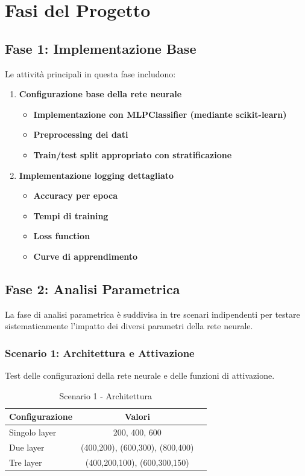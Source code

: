 \documentclass[11pt,a4paper]{article}
\begin{document}
\newpage
\section{Fasi del Progetto}

\subsection{Fase 1: Implementazione Base}
Le attività principali in questa fase includono:
\begin{enumerate}
  \item \textbf{Configurazione base della rete neurale}
  \begin{itemize}
    \item \textbf{Implementazione con MLPClassifier (mediante scikit-learn)}
    \item \textbf{Preprocessing dei dati}
    \item \textbf{Train/test split appropriato con stratificazione}
  \end{itemize}
  \item \textbf{Implementazione logging dettagliato}
  \begin{itemize}
    \item \textbf{Accuracy per epoca}
    \item \textbf{Tempi di training}
    \item \textbf{Loss function}
    \item \textbf{Curve di apprendimento}
  \end{itemize}
\end{enumerate}

\subsection{Fase 2: Analisi Parametrica}
La fase di analisi parametrica è suddivisa in tre scenari indipendenti per testare sistematicamente l'impatto dei diversi parametri della rete neurale.

\subsubsection{Scenario 1: Architettura e Attivazione}
Test delle configurazioni della rete neurale e delle funzioni di attivazione.

\begin{table}[ht]
\centering
\caption{Scenario 1 - Architettura}
\small
\begin{tabular}{@{}lcc@{}}
\toprule
\textbf{Configurazione} & \textbf{Valori} \\
\midrule
Singolo layer & 200, 400, 600 \\
Due layer & (400,200), (600,300), (800,400) \\
Tre layer & (400,200,100), (600,300,150) \\
\bottomrule
\end{tabular}
\end{table}
\vspace{0.5cm}
\end{document}
